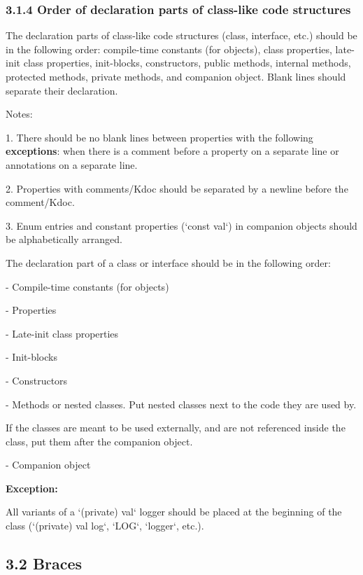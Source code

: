 \subsubsection*{\textbf{3.1.4 Order of declaration parts of class-like code structures}}
\leavevmode\newline

\label{sec:3.1.4}

The declaration parts of class-like code structures (class, interface, etc.) should be in the following order: compile-time constants (for objects), class properties, late-init class properties, init-blocks, constructors, public methods, internal methods, protected methods, private methods, and companion object. Blank lines should separate their declaration.

Notes:

1.	There should be no blank lines between properties with the following \textbf{exceptions}: when there is a comment before a property on a separate line or annotations on a separate line.

2.	Properties with comments/Kdoc should be separated by a newline before the comment/Kdoc.

3.	Enum entries and constant properties (`const val`) in companion objects should be alphabetically arranged.



The declaration part of a class or interface should be in the following order:

- Compile-time constants (for objects)

- Properties

- Late-init class properties

- Init-blocks

- Constructors

- Methods or nested classes. Put nested classes next to the code they are used by.

If the classes are meant to be used externally, and are not referenced inside the class, put them after the companion object.

- Companion object



\textbf{Exception:}

All variants of a `(private) val` logger should be placed at the beginning of the class (`(private) val log`, `LOG`, `logger`, etc.).



\subsection*{\textbf{3.2 Braces}}

